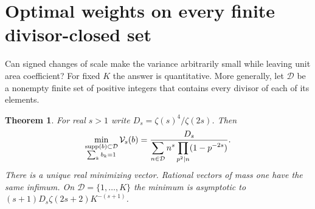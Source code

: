 \documentclass[11pt,a4paper,oneside,openany]{report}
\newtheorem{theorem}{Theorem}[section]
\theoremstyle{remark}\newtheorem{remark}[theorem]{Remark}
\numberwithin{equation}{section}
\begin{document}
\section{Optimal weights on every finite divisor-closed set}\label{ch4:sec:opt}
Can signed changes of scale make the variance arbitrarily small while leaving unit area coefficient? For fixed $K$ the answer is quantitative. More generally, let $\mathcal D$ be a nonempty finite set of positive integers that contains every divisor of each of its elements.
\begin{theorem}\label{ch4:th:min}
For real $s>1$ write $D_s=\zeta(s)^4/\zeta(2s)$. Then
\begin{equation}\label{ch4:eq:min}
 \min_{\substack{\operatorname{supp}(b)\subset\mathcal D\\ \sum_k b_k=1}}\mathcal V_s(b)
 =\frac{D_s}{\displaystyle\sum_{n\in\mathcal D}
 n^s\prod_{p^2\mid n}(1-p^{-2s})}.
\end{equation}
There is a unique real minimizing vector. Rational vectors of mass one have the same infimum. On $\mathcal D=\{1,\ldots,K\}$ the minimum is asymptotic to
$(s+1)D_s\zeta(2s+2)K^{-(s+1)}$.
\end{theorem}
\end{document}
